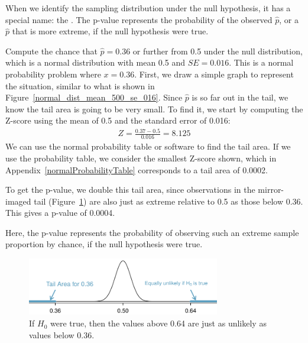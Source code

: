 When we identify the sampling distribution under the null hypothesis,
it has a special name: the . The p-value
represents the probability of the observed $\hat{p}$, or a $\hat{p}$
that is more extreme, if the null hypothesis were true.

\begin{example}{Compute the chance that $\hat{p} = 0.36$ or
    further from 0.5 under the null distribution, which is a
    normal distribution with mean 0.5 and $SE = 0.016$.}
  This is a normal probability problem where $x = 0.36$.
  First, we draw a simple graph to represent the situation,
  similar to what is shown in
  Figure~\ref{normal_dist_mean_500_se_016}.
  Since $\hat{p}$ is so far out in the tail, we know the
  tail area is going to be very small. To find it, we start
  by computing the Z-score using the mean of 0.5 and the
  standard error of 0.016:
  \begin{align*}
  Z = \frac{0.37 - 0.5}{0.016} = 8.125 
  \end{align*}
  We can use the normal probability table or software to find
  the tail area. If we use the probability table, we consider the
  smallest Z-score shown, which in
  Appendix~\ref{normalProbabilityTable}
  corresponds to a tail area of 0.0002.

  To get the p-value, we double this tail area, since observations
  in the mirror-imaged tail
  (Figure~\ref{normal_dist_mean_500_se_016_with_upper})
  are also just as extreme
  relative to 0.5 as those below 0.36.
  This gives a p-value of 0.0004.

  Here, the p-value represents the probability of observing
  such an extreme sample proportion by chance, if the null hypothesis
  were true.
\end{example}

\begin{figure}[hht]
\centering
\includegraphics[width=0.75\textwidth]{ch_inference_for_props/figures/normal_dist_mean_500_se_016/normal_dist_mean_500_se_016_with_upper}
\caption{
  If $H_0$ were true, then the values above 0.64 are just
  as unlikely as values below 0.36.}
\label{normal_dist_mean_500_se_016_with_upper}
\end{figure}




